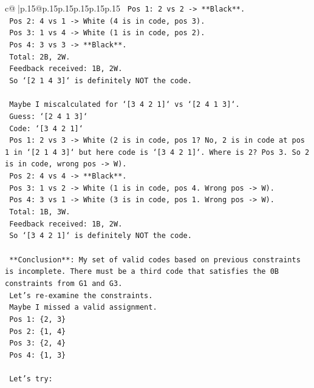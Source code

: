 \documentclass{article}
\begin{document}
{\begin{supertabular}{c@{$\;$}|p{.15\linewidth}@{}p{.15\linewidth}p{.15\linewidth}p{.15\linewidth}p{.15\linewidth}p{.15\linewidth}}
{{{\texttt{    Pos 1: 2 vs 2 {-}> **Black**.} \\
\texttt{    Pos 2: 4 vs 1 {-}> White (4 is in code, pos 3).} \\
\texttt{    Pos 3: 1 vs 4 {-}> White (1 is in code, pos 2).} \\
\texttt{    Pos 4: 3 vs 3 {-}> **Black**.} \\
\texttt{    Total: 2B, 2W.} \\
\texttt{    Feedback received: 1B, 2W.} \\
\texttt{    So `{[}2 1 4 3{]}` is definitely NOT the code.} \\
\\ 
\texttt{    Maybe I miscalculated for `{[}3 4 2 1{]}` vs `{[}2 4 1 3{]}`.} \\
\texttt{    Guess: `{[}2 4 1 3{]}`} \\
\texttt{    Code: `{[}3 4 2 1{]}`} \\
\texttt{    Pos 1: 2 vs 3 {-}> White (2 is in code, pos 1? No, 2 is in code at pos 1 in `{[}2 1 4 3{]}` but here code is `{[}3 4 2 1{]}`. Where is 2? Pos 3. So 2 is in code, wrong pos {-}> W).} \\
\texttt{    Pos 2: 4 vs 4 {-}> **Black**.} \\
\texttt{    Pos 3: 1 vs 2 {-}> White (1 is in code, pos 4. Wrong pos {-}> W).} \\
\texttt{    Pos 4: 3 vs 1 {-}> White (3 is in code, pos 1. Wrong pos {-}> W).} \\
\texttt{    Total: 1B, 3W.} \\
\texttt{    Feedback received: 1B, 2W.} \\
\texttt{    So `{[}3 4 2 1{]}` is definitely NOT the code.} \\
\\ 
\texttt{    **Conclusion**: My set of valid codes based on previous constraints is incomplete. There must be a third code that satisfies the 0B constraints from G1 and G3.} \\
\texttt{    Let's re{-}examine the constraints.} \\
\texttt{    Maybe I missed a valid assignment.} \\
\texttt{    Pos 1: \{2, 3\}} \\
\texttt{    Pos 2: \{1, 4\}} \\
\texttt{    Pos 3: \{2, 4\}} \\
\texttt{    Pos 4: \{1, 3\}} \\
\\ 
\texttt{    Let's try:} \\
}}}
\end{supertabular}}
\end{document}
